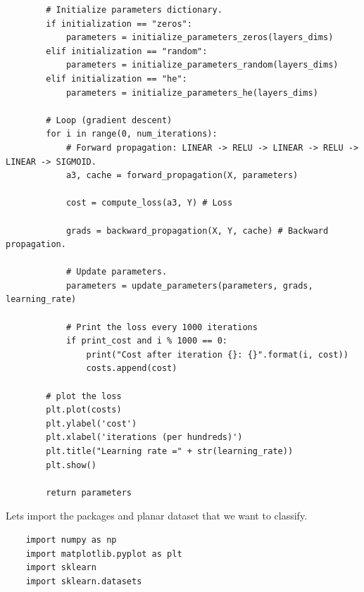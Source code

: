 \documentclass[11pt, a4paper]{article}
\begin{document}
\begin{spacing}{1.1}
\begin{lstlisting}
		# Initialize parameters dictionary.
		if initialization == "zeros":
			parameters = initialize_parameters_zeros(layers_dims)
		elif initialization == "random":
			parameters = initialize_parameters_random(layers_dims)
		elif initialization == "he":
			parameters = initialize_parameters_he(layers_dims)
		
		# Loop (gradient descent)
		for i in range(0, num_iterations):
			# Forward propagation: LINEAR -> RELU -> LINEAR -> RELU -> LINEAR -> SIGMOID.
			a3, cache = forward_propagation(X, parameters)
			
			cost = compute_loss(a3, Y) # Loss
			
			grads = backward_propagation(X, Y, cache) # Backward propagation.
			
			# Update parameters.
			parameters = update_parameters(parameters, grads, learning_rate)
			
			# Print the loss every 1000 iterations
			if print_cost and i % 1000 == 0:
				print("Cost after iteration {}: {}".format(i, cost))
				costs.append(cost)
		
		# plot the loss
		plt.plot(costs)
		plt.ylabel('cost')
		plt.xlabel('iterations (per hundreds)')
		plt.title("Learning rate =" + str(learning_rate))
		plt.show()
		
		return parameters \end{lstlisting} \newpage

	\noindent Lets import the packages and planar dataset that we want to classify. \\
	\begin{minipage}[c]{10.5cm}
	\begin{lstlisting}
	import numpy as np
	import matplotlib.pyplot as plt
	import sklearn
	import sklearn.datasets
	

\end{lstlisting}
\end{minipage}
\end{spacing}
\end{document}
